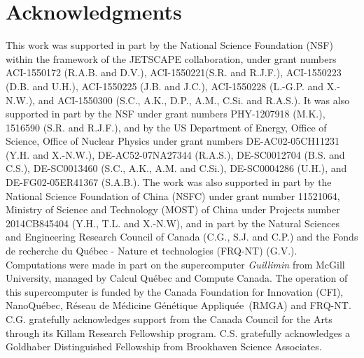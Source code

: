 \documentclass[aps,prc,twocolumn,floatfix,superscriptaddress,nofootinbib]{revtex4}
\begin{document}
\section*{Acknowledgments} 
This  work  was  supported  in  part  by  the National Science Foundation (NSF) within the framework of the JETSCAPE collaboration, under grant numbers ACI-1550172 (R.A.B. and D.V.), ACI-1550221(S.R. and R.J.F.), ACI-1550223 (D.B. and U.H.), ACI-1550225 (J.B. and J.C.), ACI-1550228 (L.-G.P. and X.-N.W.), and ACI-1550300 (S.C., A.K., D.P., A.M., C.Si. and R.A.S.). It was also supported in part by the NSF under grant numbers PHY-1207918 (M.K.), 1516590 (S.R. and R.J.F.), and by the US Department of Energy, Office of Science, Office of Nuclear Physics under grant numbers \rm{DE-AC02-05CH11231} (Y.H. and X.-N.W.), \rm{DE-AC52-07NA27344} (R.A.S.), \rm{DE-SC0012704} (B.S. and C.S.), \rm{DE-SC0013460} (S.C., A.K., A.M. and C.Si.), \rm{DE-SC0004286} (U.H.), and \rm{DE-FG02-05ER41367} (S.A.B.). The work was also supported in part by the National Science Foundation of China (NSFC) under grant number 11521064, Ministry of Science and Technology (MOST) of China under Projects number 2014CB845404 (Y.H., T.L. and X.-N.W), and in part by the Natural Sciences and Engineering Research Council of Canada (C.G., S.J. and C.P.) and the Fonds de recherche du Qu\'ebec - Nature et technologies (FRQ-NT) (G.V.).  Computations were made in part on the supercomputer \emph{Guillimin} from McGill University, managed by Calcul Qu\'ebec and Compute Canada. The operation of this supercomputer is funded by the Canada Foundation for Innovation (CFI), NanoQu\'ebec, R\'eseau de M\'edicine G\'en\'etique Appliqu\'ee~(RMGA) and FRQ-NT. C.G. gratefully acknowledges support from the Canada Council for the Arts through its Killam Research Fellowship program. C.S. gratefully acknowledges a Goldhaber Distinguished Fellowship from Brookhaven Science Associates.
 



%

\end{document}
